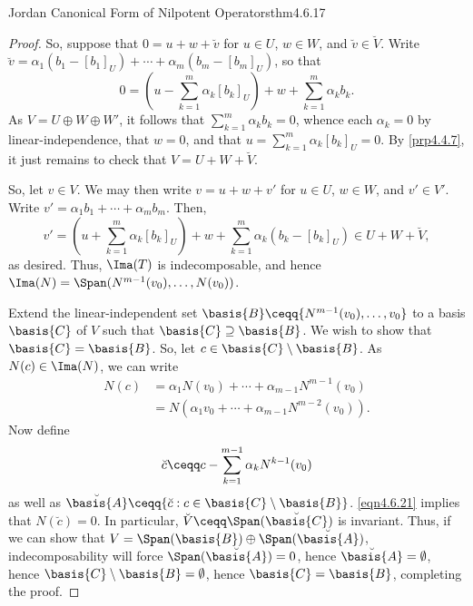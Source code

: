 \begin{thm}{Jordan Canonical Form of Nilpotent Operators}{thm4.6.17}
\begin{proof}
		So, suppose that $0=u+w+\breve{v}$ for $u\in U$, $w\in W$, and $\breve{v}\in \breve{V}$.  Write $\breve{v}=\alpha _1(b_1-[b_1]_U)+\cdots +\alpha _m(b_m-[b_m]_U)$, so that
		\begin{equation}
			0=\left( u-\sum _{k=1}^m\alpha _k[b_k]_U\right) +w+\sum _{k=1}^m\alpha _kb_k.
		\end{equation}
		As $V=U\oplus W\oplus W'$, it follows that $\sum _{k=1}^m\alpha _kb_k=0$, whence each $\alpha _k=0$ by linear-independence, that $w=0$, and that $u=\sum _{k=1}^m\alpha _k[b_k]_U=0$.  By \cref{prp4.4.7}, it just remains to check that $V=U+W+\breve{V}$.
		
		So, let $v\in V$.  We may then write $v=u+w+v'$ for $u\in U$, $w\in W$, and $v'\in V'$.  Write $v'=\alpha _1b_1+\cdots +\alpha _mb_m$.  Then,
		\begin{equation}
			v'=\left( u+\sum _{k=1}^m\alpha _k[b_k]_U\right) +w+\sum _{k=1}^m\alpha _k(b_k-[b_k]_U)\in U+W+\breve{V},
		\end{equation}
		as desired.  Thus, $\Ima (T)$ is indecomposable, and hence $\Ima (N)=\Span (N^{m-1}(v_0),\ldots ,N(v_0))$.
		
		Extend the linear-independent set $\basis{B}\ceqq \{ N^{m-1}(v_0),\ldots ,v_0\}$ to a basis $\basis{C}$ of $V$ such that $\basis{C}\supseteq \basis{B}$.  We wish to show that $\basis{C}=\basis{B}$.  So, let $c\in \basis{C}\setminus \basis{B}$.  As $N(c)\in \Ima (N)$, we can write
		\begin{equation}\label{eqn4.6.21}
			\begin{split}
				N(c)& =\alpha _1N(v_0)+\cdots +\alpha _{m-1}N^{m-1}(v_0) \\
				& =N\left( \alpha _1v_0+\cdots +\alpha _{m-1}N^{m-2}(v_0)\right) .
			\end{split}
		\end{equation}
		Now define
		\begin{equation}\label{eqn4.6.22}
			\breve{c}\ceqq c-\sum _{k=1}^{m-1}\alpha _kN^{k-1}(v_0)
		\end{equation}
		as well as $\breve{\basis{A}}\ceqq \{ \breve{c}:c\in \basis{C}\setminus \basis{B}\}$.  \eqref{eqn4.6.21} implies that $N(\breve{c})=0$.  In particular, $\breve{V}\ceqq \Span (\breve{\basis{C}})$ is invariant.  Thus, if we can show that $V=\Span (\basis{B})\oplus \Span (\breve{\basis{A}})$, indecomposability will force $\Span (\breve{\basis{A}})=0$, hence $\breve{\basis{A}}=\emptyset$, hence $\basis{C}\setminus \basis{B}=\emptyset$, hence $\basis{C}=\basis{B}$, completing the proof.
		

\end{proof}
\end{thm}
